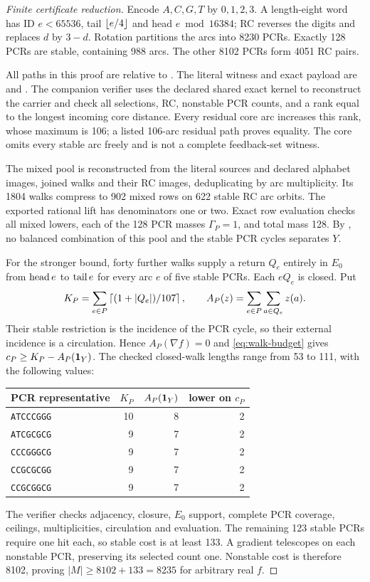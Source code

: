 \begin{proof}[Finite certificate reduction]
Encode $A,C,G,T$ by $0,1,2,3$. A length-eight word has ID $e<65536$,
tail $\left\lfloor e/4\right\rfloor$ and head $e\bmod16384$; RC reverses the digits and
replaces $d$ by $3-d$. Rotation partitions the arcs into 8230 PCRs.
Exactly 128 PCRs are stable, containing 988 arcs. The other 8102 PCRs
form 4051 RC pairs.

All paths in this proof are relative to .
The literal witness and exact payload are
 and
.
The companion verifier 
uses the declared shared exact kernel to reconstruct the carrier and check
all selections, RC, nonstable PCR counts,
and a rank equal to the longest incoming core distance. Every residual core
arc increases this rank, whose maximum is 106; a listed 106-arc residual
path proves equality. The core omits every stable arc freely and is not a
complete feedback-set witness.

The mixed pool is reconstructed from the literal sources and declared
alphabet images, joined walks and their RC images, deduplicating by arc
multiplicity. Its 1804 walks compress to 902 mixed rows on 622 stable RC
arc orbits. The exported rational lift has denominators one or two.
Exact row evaluation checks all mixed lowers, each of the 128 PCR masses
$\Gamma_P=1$, and total mass 128. By , no
balanced combination of this pool and the stable PCR cycles separates $Y$.

For the stronger bound, forty further walks supply a return $Q_e$ entirely
in $E_0$ from $\operatorname{head} e$ to $\operatorname{tail} e$ for every arc $e$ of five stable PCRs.
Each $eQ_e$ is closed. Put
\[
 K_P=\sum_{e\in P}\left\lceil(1+|Q_e|)/107\right\rceil,\qquad
 A_P(z)=\sum_{e\in P}\sum_{a\in Q_e}z(a).
\]
Their stable restriction is the incidence of the PCR cycle, so their external
incidence is a circulation. Hence $A_P(\nabla f)=0$ and
\eqref{eq:walk-budget} gives $c_P\ge K_P-A_P(\mathbf 1_Y)$.
The checked closed-walk lengths range from 53 to 111, with the following values:
\begin{center}
\begin{tabular}{lrrr}\toprule
PCR representative & $K_P$ & $A_P(\mathbf 1_Y)$ & lower on $c_P$\\\midrule
\texttt{ATCCCGGG} & 10 & 8 & 2\\
\texttt{ATCGCGCG} & 9 & 7 & 2\\
\texttt{CCCGGGCG} & 9 & 7 & 2\\
\texttt{CCGCGCGG} & 9 & 7 & 2\\
\texttt{CCGCGGCG} & 9 & 7 & 2\\\bottomrule
\end{tabular}
\end{center}
The verifier checks adjacency, closure, $E_0$ support, complete PCR coverage,
ceilings, multiplicities, circulation and evaluation. The remaining 123
stable PCRs require one hit each, so stable cost is at least 133.
A gradient telescopes on each nonstable PCR, preserving its selected count
one. Nonstable cost is therefore 8102, proving $|M|\ge8102+133=8235$ for
arbitrary real $f$.
\end{proof}

